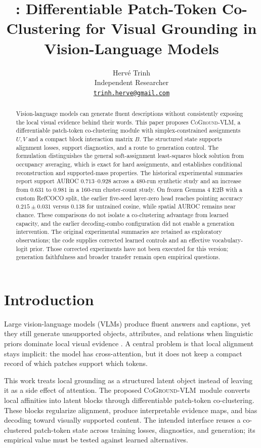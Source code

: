 \documentclass[11pt,a4paper]{article}
\title{\method: Differentiable Patch-Token Co-Clustering for Visual Grounding in Vision-Language Models}
\author{Herv\'e Trinh\\Independent Researcher\\
\href{mailto:trinh.herve@gmail.com}{\texttt{trinh.herve@gmail.com}}}
\date{}
\newcommand{\method}{\textsc{CoGround-VLM}}
\begin{document}
\maketitle

\begin{abstract}
Vision-language models can generate fluent descriptions without consistently exposing the local visual evidence behind their words. This paper proposes \method, a differentiable patch-token co-clustering module with simplex-constrained assignments $U,V$ and a compact block interaction matrix $B$. The structured state supports alignment losses, support diagnostics, and a route to generation control. The formulation distinguishes the general soft-assignment least-squares block solution from occupancy averaging, which is exact for hard assignments, and establishes conditional reconstruction and supported-mass properties. The historical experimental summaries report support AUROC $0.713$--$0.928$ across a 480-run synthetic study and an increase from $0.631$ to $0.981$ in a 160-run cluster-count study. On frozen Gemma 4 E2B with a custom RefCOCO split, the earlier five-seed layer-zero head reaches pointing accuracy $0.215\pm0.031$ versus $0.138$ for untrained cosine, while spatial AUROC remains near chance. These comparisons do not isolate a co-clustering advantage from learned capacity, and the earlier decoding-combo configuration did not enable a generation intervention. The original experimental summaries are retained as exploratory observations; the code supplies corrected learned controls and an effective vocabulary-logit prior. Those corrected experiments have not been executed for this version; generation faithfulness and broader transfer remain open empirical questions.
\end{abstract}

\section{Introduction}
\label{sec:intro}

Large vision-language models (VLMs) produce fluent answers and captions, yet they still generate unsupported objects, attributes, and relations when linguistic priors dominate local visual evidence \cite{rohrbach2018object,li2023pope}. A central problem is that local alignment stays implicit: the model has cross-attention, but it does not keep a compact record of which patches support which tokens.

This work treats local grounding as a structured latent object instead of leaving it as a side effect of attention. The proposed \method\ module converts local affinities into latent blocks through differentiable patch-token co-clustering. These blocks regularize alignment, produce interpretable evidence maps, and bias decoding toward visually supported content. The intended interface reuses a co-clustered patch-token state across training losses, diagnostics, and generation; its empirical value must be tested against learned alternatives.
\end{document}
